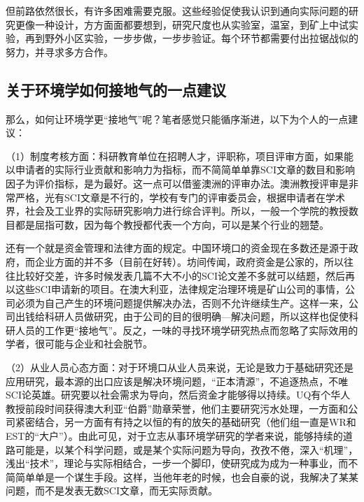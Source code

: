 \documentclass[
]{book}
\begin{document}
但前路依然很长，有许多困难需要克服。这些经验促使我认识到通向实际问题的研究更像一种设计，方方面面都要想到，研究尺度也从实验室，温室，到矿上中试实验，再到野外小区实验，一步步做，一步步验证。每个环节都需要付出拉锯战似的努力，并寻求多方合作。

\hypertarget{ux5173ux4e8eux73afux5883ux5b66ux5982ux4f55ux63a5ux5730ux6c14ux7684ux4e00ux70b9ux5efaux8bae}{%
\subsection{关于环境学如何接地气的一点建议}\label{ux5173ux4e8eux73afux5883ux5b66ux5982ux4f55ux63a5ux5730ux6c14ux7684ux4e00ux70b9ux5efaux8bae}}

那么，如何让环境学更``接地气''呢？笔者感觉只能循序渐进，以下为个人的一点建议：

（1）制度考核方面：科研教育单位在招聘人才，评职称，项目评审方面，如果能以申请者的实际行业贡献和影响力为指标，而不简简单单靠SCI文章的数目和影响因子为评价指标，是为最好。这一点可以借鉴澳洲的评审办法。澳洲教授评审是非常严格，光有SCI文章是不行的，学校有专门的评审委员会，根据申请者在学术界，社会及工业界的实际研究影响力进行综合评判。所以，一般一个学院的教授数目都是屈指可数，因为每个教授都代表一个方向，可以是某个行业的翘楚。

还有一个就是资金管理和法律方面的规定。中国环境口的资金现在多数还是源于政府，而企业方面的并不多（目前在好转）。坊间传闻，政府资金是公家的，所以往往比较好交差，许多时候发表几篇不大不小的SCI论文差不多就可以结题，然后再以这些SCI申请新的项目。在澳大利亚，法律规定治理环境是矿山公司的事情，公司必须为自己产生的环境问题提供解决办法，否则不允许继续生产。这样一来，公司出钱给科研人员做研究，由于公司的目的很明确---解决问题，所以这样也促使科研人员的工作更``接地气''。反之，一味的寻找环境学研究热点而忽略了实际效用的学者，很可能与企业和社会脱节。

（2）从业人员心态方面：对于环境口从业人员来说，无论是致力于基础研究还是应用研究，最本源的出口应该是解决环境问题，``正本清源''，不追逐热点，不唯SCI论英雄。研究要以社会需求为导向，然后资金才能够得以持续。UQ有个华人教授前段时间获得澳大利亚``伯爵''勋章荣誉，他们主要研究污水处理，一方面和公司紧密结合，另一方面有有持之以恒的有的放矢的基础研究（他们组一直是WR和EST的``大户''）。由此可见，对于立志从事环境学研究的学者来说，能够持续的道路可能是，以某个科学问题，或是某个实际问题为导向，孜孜不倦，深入``机理''，浅出``技术''，理论与实际相结合，一步一个脚印，使研究成为成为一种事业，而不简简单单是一个谋生手段。这样，当他年老的时候，也会自豪的说，我解决了某某问题，而不是发表无数SCI文章，而无实际贡献。
\end{document}
